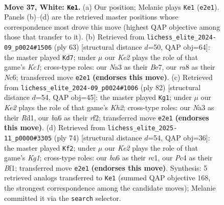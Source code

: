 \documentclass[11pt]{article}
\begin{document}
\clearpage

\begin{figure}[p]\centering
\begin{subfigure}{0.46\textwidth}\centering
\resizebox{\linewidth}{!}{%
\newchessgame
\chessboard[
  setfen={r7/p1pp4/bp1n2k1/5p1p/BPP2P2/N7/P2PK2P/R7 w - - 3 37},
  showmover=false,
  pgfstyle=straightmove, color=movearrow, markmove={e2-e1}
]}
\caption{}
\end{subfigure}\hfill
\begin{subfigure}{0.46\textwidth}\centering
\resizebox{\linewidth}{!}{%
\newchessgame
\chessboard[
  setfen={2k5/pp2bb2/2n2p1p/8/4p1PB/1PP4P/P4P2/3N1KN1 b - - 0 32},
  showmover=false,
  pgfstyle=straightmove, color=movearrow, markmove={c8-d7}
]}
\caption{}
\end{subfigure}
\\[4pt]
\begin{subfigure}{0.46\textwidth}\centering
\resizebox{\linewidth}{!}{%
\newchessgame
\chessboard[
  setfen={2k5/2p2p2/pp4pN/2p1P2p/2n5/P1P4P/5rPK/3R4 w - - 2 42},
  showmover=false,
  pgfstyle=straightmove, color=movearrow, markmove={h2-g1}
]}
\caption{}
\end{subfigure}\hfill
\begin{subfigure}{0.46\textwidth}\centering
\resizebox{\linewidth}{!}{%
\newchessgame
\chessboard[
  setfen={5k2/1b3pp1/1P1n3p/p2PN3/1p2P3/1R3PPP/8/2r2BK1 w - - 0 38},
  showmover=false,
  pgfstyle=straightmove, color=movearrow, markmove={g1-f2}
]}
\caption{}
\end{subfigure}
\caption{\textbf{Move 37, White: \texttt{Ke1}.} (a) Our position; Melanie plays \texttt{Ke1} (\texttt{e2e1}). Panels (b)--(d) are the retrieved master positions whose correspondence most drove this move (highest QAP objective among those that transfer to it). (b) Retrieved from \texttt{lichess\_elite\_2024-09\_p0024\#1506} (ply 63) [structural distance $d$=50, QAP obj=64]: the master played \texttt{Kd7}; under $\mu$ our \emph{Ke2} plays the role of that game's \emph{Kc1}; cross-type roles: our \emph{N}a3 as their \emph{B}e7, our \emph{r}a8 as their \emph{N}c6; transferred move \texttt{e2e1} \textbf{(endorses this move)}. (c) Retrieved from \texttt{lichess\_elite\_2024-09\_p0024\#1006} (ply 82) [structural distance $d$=54, QAP obj=45]: the master played \texttt{Kg1}; under $\mu$ our \emph{Ke2} plays the role of that game's \emph{Kh2}; cross-type roles: our \emph{N}a3 as their \emph{R}d1, our \emph{b}a6 as their \emph{r}f2; transferred move \texttt{e2e1} \textbf{(endorses this move)}. (d) Retrieved from \texttt{lichess\_elite\_2025-11\_p0000\#3305} (ply 74) [structural distance $d$=54, QAP obj=36]: the master played \texttt{Kf2}; under $\mu$ our \emph{Ke2} plays the role of that game's \emph{Kg1}; cross-type roles: our \emph{b}a6 as their \emph{r}c1, our \emph{P}c4 as their \emph{B}f1; transferred move \texttt{e2e1} \textbf{(endorses this move)}. Synthesis: 5 retrieved analogs transferred to \texttt{Ke1} (summed QAP objective 168, the strongest correspondence among the candidate moves); Melanie committed it via the \texttt{search} selector.}
\label{fig:thought-m72}
\end{figure}
\end{document}
